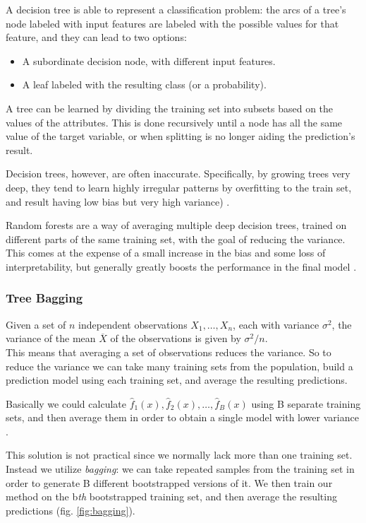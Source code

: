 A decision tree is able to represent a classification problem:
the arcs of a tree's node labeled with input features are labeled with the possible values for that feature, and they can lead to two options:
\begin{itemize}[noitemsep]
	\item A subordinate decision node, with different input features.
	\item A leaf labeled with the resulting class (or a probability).
\end{itemize}

A tree can be learned by dividing the training set into subsets based on the values of the attributes. This is done recursively until a node has all the same value of the target variable, or when splitting is no longer aiding the prediction's result.


Decision trees, however, are often inaccurate. Specifically, by growing trees very deep, they tend to learn highly irregular patterns by overfitting to the train set, and result having low bias but very high variance) \cite{ESL}. 

Random forests are a way of averaging multiple deep decision trees, trained on different parts of the same training set, with the goal of reducing the variance. \\
This comes at the expense of a small increase in the bias and some loss of interpretability, but generally greatly boosts the performance in the final model \cite{ESL}. 

\subsubsection{Tree Bagging}
Given a set of $n$ independent observations $X_1, \dots, X_n$, each with variance $\sigma^2$, the variance of the mean $\overline{X}$ of the observations is given by $\sigma^2/n$. \\
This means that averaging a set of observations reduces the variance. So to reduce the variance we can take many training sets from the population, build a prediction model using each training set, and average the resulting predictions. 

Basically we could calculate $\hat{f}_1(x), \hat{f}_2(x), \dots, \hat{f}_B(x)$ using B separate training sets, and then average them in order to obtain a single model with lower variance \cite{ISLR}.

This solution is not practical since we normally lack more than one training set. \\
Instead we utilize \textit{bagging}: we can take repeated samples from the training set in order to generate B different bootstrapped versions of it. We then train our method on the b\textit{th} bootstrapped training set, and then average the resulting predictions (fig. \ref{fig:bagging}).

